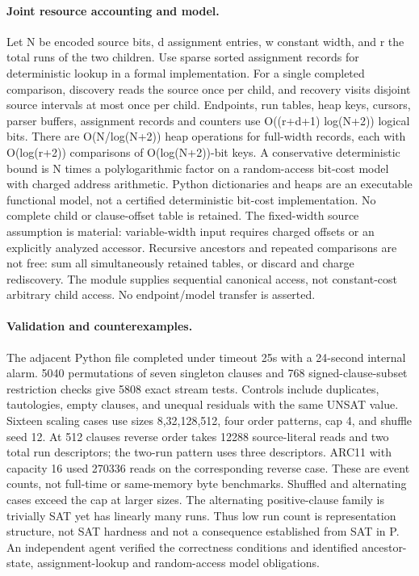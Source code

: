 \documentclass{article}
\begin{document}
\paragraph{Joint resource accounting and model.}
Let N be encoded source bits, d assignment entries, w constant width,
and r the total runs of the two children. Use sparse sorted assignment
records for deterministic lookup in a formal implementation.
For a single completed comparison, discovery reads the source once per
child, and recovery visits disjoint source intervals at most once per
child. Endpoints, run tables, heap keys, cursors, parser buffers,
assignment records and counters use O((r+d+1) log(N+2)) logical bits.
There are O(N/log(N+2)) heap operations for full-width records,
each with O(log(r+2)) comparisons of O(log(N+2))-bit keys.
A conservative deterministic bound is N times a polylogarithmic factor
on a random-access bit-cost model with charged address arithmetic.
Python dictionaries and heaps are an executable functional model, not
a certified deterministic bit-cost implementation.
No complete child or clause-offset table is retained.
The fixed-width source assumption is material: variable-width input
requires charged offsets or an explicitly analyzed accessor.
Recursive ancestors and repeated comparisons are not free:
sum all simultaneously retained tables, or discard and charge rediscovery.
The module supplies sequential canonical access, not constant-cost
arbitrary child access. No endpoint/model transfer is asserted.

\paragraph{Validation and counterexamples.}
The adjacent Python file completed under timeout 25s with a 24-second
internal alarm. 5040 permutations of seven singleton clauses and 768
signed-clause-subset restriction checks give 5808 exact stream tests.
Controls include duplicates, tautologies, empty clauses, and unequal
residuals with the same UNSAT value. Sixteen scaling cases use sizes
8,32,128,512, four order patterns, cap 4, and shuffle seed 12.
At 512 clauses reverse order takes 12288 source-literal reads and two
total run descriptors; the two-run pattern uses three descriptors.
ARC11 with capacity 16 used 270336 reads on the corresponding reverse case.
These are event counts, not full-time or same-memory byte benchmarks.
Shuffled and alternating cases exceed the cap at larger sizes.
The alternating positive-clause family is trivially SAT yet has linearly
many runs. Thus low run count is representation structure, not SAT hardness
and not a consequence established from SAT in P.
An independent agent verified the correctness conditions and identified
ancestor-state, assignment-lookup and random-access model obligations.
\end{document}
